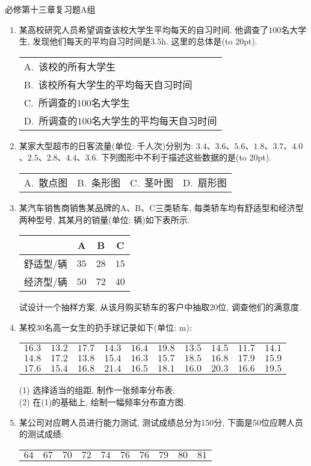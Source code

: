 \documentclass[10pt,a4paper]{article}
\newcommand{\bracket}[1]{(\hbox to #1pt{})}
\newcommand{\onech}[4]{\par\begin{tabular}{p{.9\textwidth}}
A.~#1\\
B.~#2\\
C.~#3\\
D.~#4
\end{tabular}}
\newcommand{\fourch}[4]{\par\begin{tabular}{p{.23\textwidth}p{.23\textwidth}p{.23\textwidth}p{.23\textwidth}}
A.~#1 &B.~#2& C.~#3& D.~#4
\end{tabular}}
\begin{document}
必修第十三章复习题A组

\begin{enumerate}[1.]
\item 某高校研究人员希望调查该校大学生平均每天的自习时间. 他调查了$100$名大学生, 发现他们每天的平均自习时间是$3.5\text{h}$. 这里的总体是\bracket{20}.
\onech{该校的所有大学生}{该校所有大学生的平均每天自习时间}{所调查的$100$名大学生}{所调查的$100$名大学生的平均每天自习时间}
\item 某家大型超市的日客流量(单位: 千人次)分别为: $3.4$、$3.6$、$5.6$、$1.8$、$3.7$、$4.0$、$2.5$、$2.8$、$4.4$、$3.6$. 下列图形中不利于描述这些数据的是\bracket{20}.
\fourch{散点图}{条形图}{茎叶图}{扇形图}
\item 某汽车销售商销售某品牌的A、B、C三类轿车, 每类轿车均有舒适型和经济型两种型号, 其某月的销量(单位: 辆)如下表所示.
\begin{center}
    \begin{tabular}{|c|c|c|c|}
        \hline
        & A & B & C \\ \hline
        舒适型/辆 & $35$ & $28$ & $15$\\ \hline
        经济型/辆 & $50$ & $72$ & $40$\\ \hline
    \end{tabular}
\end{center}
试设计一个抽样方案, 从该月购买轿车的客户中抽取20位, 调查他们的满意度.
\item 某校$30$名高一女生的扔手球记录如下(单位: $\text{m}$):
\begin{center}
    \begin{tabular}{cccccccccc}
        $16.3$ & $13.2$ & $17.7$ & $14.3$ & $16.4$ & $19.8$ & $13.5$ & $14.5$ & $11.7$ & $14.1$\\
        $14.8$ & $17.2$ & $13.8$ & $15.4$ & $16.3$ & $15.7$ & $18.5$ & $16.8$ & $17.9$ & $15.9$\\
        $17.6$ & $15.4$ & $16.8$ & $21.4$ & $16.5$ & $18.1$ & $16.0$ & $20.3$ & $16.6$ & $19.5$
    \end{tabular}
\end{center}
(1) 选择适当的组距, 制作一张频率分布表;\\
(2) 在(1)的基础上, 绘制一幅频率分布直方图.
\item 某公司对应聘人员进行能力测试, 测试成绩总分为150分, 下面是50位应聘人员
的测试成绩:
\begin{center}
    \begin{tabular}{cccccccccc}
        $64$ & $67$ & $70$ & $72$ & $74$ & $76$ & $76$ & $79$ & $80$ & $81$ \\

\end{tabular}
\end{center}
\end{enumerate}
\end{document}
